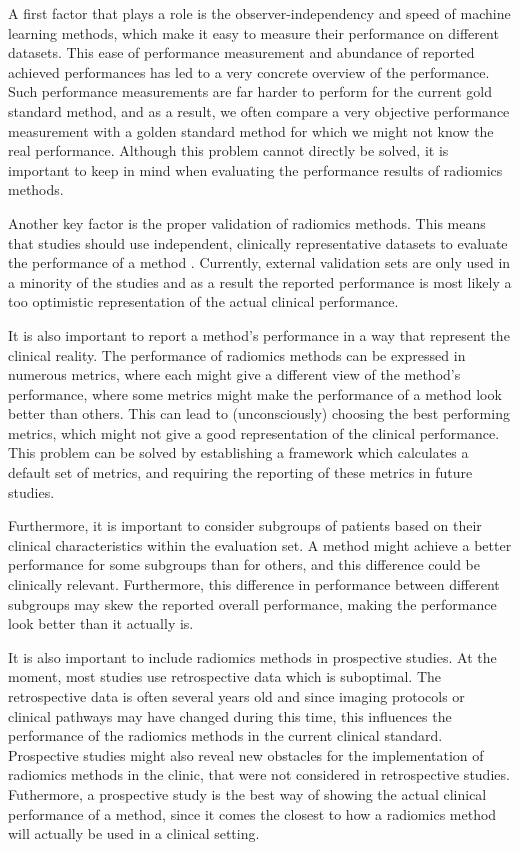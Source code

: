A first factor that plays a role is the observer-independency and speed of machine learning methods, which make it easy to measure their performance on different datasets.
This ease of performance measurement and abundance of reported achieved performances has led to a very concrete overview of the performance.
Such performance measurements are far harder to perform for the current gold standard method, and as a result, we often compare a very objective performance measurement with a golden standard method for which we might not know the real performance.
Although this problem cannot directly be solved, it is important to keep in mind when evaluating the performance results of radiomics methods.

Another key factor is the proper validation of radiomics methods.
This means that studies should use independent, clinically representative datasets to evaluate the performance of a method \autocite{gillies2016radiomics, rizzo2018radiomics, lohmann2020radiomics, yip2016applicationsradiomics}.
Currently, external validation sets are only used in a minority of the studies and as a result the reported performance is most likely a too optimistic representation of the actual clinical performance.

It is also important to report a method's performance in a way that represent the clinical reality.
The performance of radiomics methods can be expressed in numerous metrics, where each might give a different view of the method's performance, where some metrics might make the performance of a method look better than others.
This can lead to (unconsciously) choosing the best performing metrics, which might not give a good representation of the clinical performance.
This problem can be solved by establishing a framework which calculates a default set of metrics, and requiring the reporting of these metrics in future studies.

Furthermore, it is important to consider subgroups of patients based on their clinical characteristics within the evaluation set.
A method might achieve a better performance for some subgroups than for others, and this difference could be clinically relevant.
Furthermore, this difference in performance between different subgroups may skew the reported overall performance, making the performance look better than it actually is.

It is also important to include radiomics methods in prospective studies.
At the moment, most studies use retrospective data which is suboptimal.
The retrospective data is often several years old and since imaging protocols or clinical pathways may have changed during this time, this influences the performance of the radiomics methods in the current clinical standard.
Prospective studies might also reveal new obstacles for the implementation of radiomics methods in the clinic, that were not considered in retrospective studies.
Futhermore, a prospective study is the best way of showing the actual clinical performance of a method, since it comes the closest to how a radiomics method will actually be used in a clinical setting.

